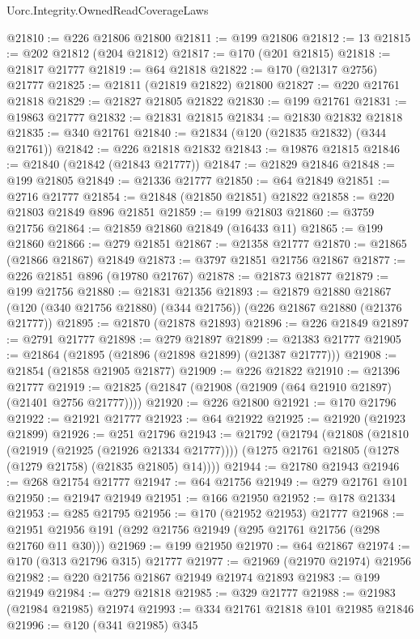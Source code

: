 \begin{lexlean}{Uorc.Integrity.OwnedReadCoverageLaws}
\begin{coremodule}
@21810 := @226 @21806 @21800
@21811 := @199 @21806
@21812 := 13
@21815 := @202 @21812 (@204 @21812)
@21817 := @170 (@201 @21815)
@21818 := @21817 @21777
@21819 := @64 @21818
@21822 := @170 (@21317 @2756) @21777
@21825 := @21811 (@21819 @21822) @21800
@21827 := @220 @21761 @21818
@21829 := @21827 @21805 @21822
@21830 := @199 @21761
@21831 := @19863 @21777
@21832 := @21831 @21815
@21834 := @21830 @21832 @21818
@21835 := @340 @21761
@21840 := @21834 (@120 (@21835 @21832) (@344 @21761))
@21842 := @226 @21818 @21832
@21843 := @19876 @21815
@21846 := @21840 (@21842 (@21843 @21777))
@21847 := @21829 @21846
@21848 := @199 @21805
@21849 := @21336 @21777
@21850 := @64 @21849
@21851 := @2716 @21777
@21854 := @21848 (@21850 @21851) @21822
@21858 := @220 @21803 @21849 @896 @21851
@21859 := @199 @21803
@21860 := @3759 @21756
@21864 := @21859 @21860 @21849 (@16433 @11)
@21865 := @199 @21860
@21866 := @279 @21851
@21867 := @21358 @21777
@21870 := @21865 (@21866 @21867) @21849
@21873 := @3797 @21851 @21756 @21867
@21877 := @226 @21851 @896 (@19780 @21767)
@21878 := @21873 @21877
@21879 := @199 @21756
@21880 := @21831 @21356
@21893 := @21879
    @21880
    @21867
    (@120 (@340 @21756 @21880) (@344 @21756))
    (@226 @21867 @21880 (@21376 @21777))
@21895 := @21870 (@21878 @21893)
@21896 := @226 @21849
@21897 := @2791 @21777
@21898 := @279 @21897
@21899 := @21383 @21777
@21905 := @21864 (@21895 (@21896 (@21898 @21899) (@21387 @21777)))
@21908 := @21854 (@21858 @21905 @21877)
@21909 := @226 @21822
@21910 := @21396 @21777
@21919 := @21825 (@21847 (@21908 (@21909 (@64 @21910 @21897) (@21401 @2756 @21777))))
@21920 := @226 @21800
@21921 := @170 @21796
@21922 := @21921 @21777
@21923 := @64 @21922
@21925 := @21920 (@21923 @21899)
@21926 := @251 @21796
@21943 := @21792
    (@21794
      (@21808
        (@21810 (@21919 (@21925 (@21926 @21334 @21777))))
        (@1275 @21761 @21805 (@1278 (@1279 @21758) (@21835 @21805) @14))))
@21944 := @21780 @21943
@21946 := @268 @21754 @21777
@21947 := @64 @21756
@21949 := @279 @21761 @101
@21950 := @21947 @21949
@21951 := @166 @21950
@21952 := @178 @21334
@21953 := @285 @21795
@21956 := @170 (@21952 @21953) @21777
@21968 := @21951 @21956 @191 (@292 @21756 @21949 (@295 @21761 @21756 (@298 @21760 @11 @30)))
@21969 := @199 @21950
@21970 := @64 @21867
@21974 := @170 (@313 @21796 @315) @21777
@21977 := @21969 (@21970 @21974) @21956
@21982 := @220 @21756 @21867 @21949 @21974 @21893
@21983 := @199 @21949
@21984 := @279 @21818
@21985 := @329 @21777
@21988 := @21983 (@21984 @21985) @21974
@21993 := @334 @21761 @21818 @101 @21985 @21846
@21996 := @120 (@341 @21985) @345

\end{coremodule}
\end{lexlean}
